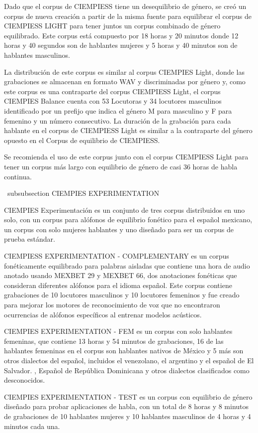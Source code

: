 Dado que el corpus de CIEMPIESS tiene un desequilibrio de género, se creó un corpus de nueva creación a partir de la misma fuente para equilibrar el corpus de CIEMPIESS LIGHT para tener juntos un corpus combinado de género equilibrado. Este corpus está compuesto por 18 horas y 20 minutos donde 12 horas y 40 segundos son de hablantes mujeres y 5 horas y 40 minutos son de hablantes masculinos.

La distribución de este corpus es similar al corpus CIEMPIES Light, donde las grabaciones se almacenan en formato WAV y discriminadas por género y, como este corpus es una contraparte del corpus CIEMPIESS Light, el corpus CIEMPIES Balance cuenta con 53 Locutoras y 34 locutores masculinos identificado por un prefijo que indica el género M para masculino y F para femenino y un número consecutivo. La duración de la grabación para cada hablante en el corpus de CIEMPIESS Light es similar a la contraparte del género opuesto en el Corpus de equilibrio de CIEMPIESS.

Se recomienda el uso de este corpus junto con el corpus CIEMPIESS Light para tener un corpus más largo con equilibrio de género de casi 36 horas de habla continua.

\ subsubsection {CIEMPIES EXPERIMENTATION }

CIEMPIES Experimentación es un conjunto de tres corpus distribuidos en uno solo, con un corpus para alófonos de equilibrio fonético para el español mexicano, un corpus con solo mujeres hablantes y uno diseñado para ser un corpus de prueba estándar.

CIEMPIESS EXPERIMENTATION - COMPLEMENTARY es un corpus fonéticamente equilibrado para palabras aisladas que contiene una hora de audio anotado usando MEXBET 29 y MEXBET 66, dos anotaciones fonéticas que consideran diferentes alófonos para el idioma español. Este corpus contiene grabaciones de 10 locutores masculinos y 10 locutores femeninos y fue creado para mejorar los motores de reconocimiento de voz que no encontraron ocurrencias de alófonos específicos al entrenar modelos acústicos.

CIEMPIES EXPERIMENTATION  - FEM es un corpus con solo hablantes femeninas, que contiene 13 horas y 54 minutos de grabaciones, 16 de las hablantes femeninas en el corpus son hablantes nativos de México y 5 más son otros dialectos del español, incluidos el venezolano, el argentino y el español de El Salvador. , Español de República Dominicana y otros dialectos clasificados como desconocidos.

CIEMPIES EXPERIMENTATION  - TEST es un corpus con equilibrio de género diseñado para probar aplicaciones de habla, con un total de 8 horas y 8 minutos de grabaciones de 10 hablantes mujeres y 10 hablantes masculinos de 4 horas y 4 minutos cada una.

